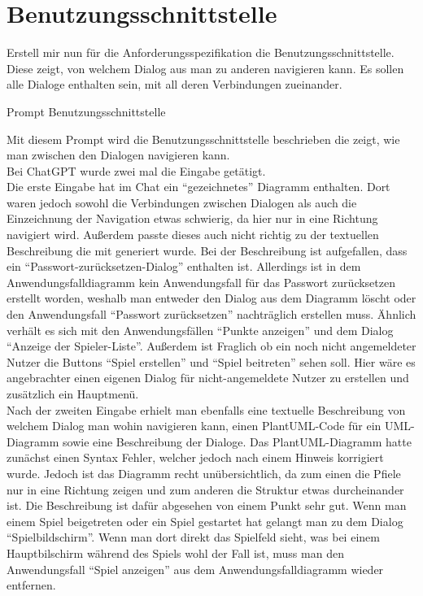 \section*{Benutzungsschnittstelle}

\begin{prompt}[H]
    \begin{tcolorbox}[colback=gray!20, colframe=gray!20, boxrule=0pt, sharp corners] 
        Erstell mir nun für die Anforderungsspezifikation die Benutzungsschnittstelle. Diese zeigt, von welchem Dialog aus man zu anderen 
        navigieren kann. Es sollen alle Dialoge enthalten sein, mit all deren Verbindungen zueinander.
        \vfill
    \end{tcolorbox}
    \caption{Prompt Benutzungsschnittstelle}
    \label{Prompt Benutzungsschnittstelle}
\end{prompt}

Mit diesem Prompt wird die Benutzungsschnittstelle beschrieben die zeigt, wie man zwischen den Dialogen navigieren kann.\\

Bei ChatGPT wurde zwei mal die Eingabe getätigt.\\
Die erste Eingabe hat im Chat ein ``gezeichnetes'' Diagramm enthalten. Dort waren jedoch sowohl die Verbindungen zwischen Dialogen als auch 
die Einzeichnung der Navigation etwas schwierig, da hier nur in eine Richtung navigiert wird. Außerdem passte dieses auch nicht richtig zu 
der textuellen Beschreibung die mit generiert wurde. Bei der Beschreibung ist aufgefallen, dass ein ``Passwort-zurücksetzen-Dialog'' enthalten 
ist. Allerdings ist in dem Anwendungsfalldiagramm kein Anwendungsfall für das Passwort zurücksetzen erstellt worden, weshalb man entweder 
den Dialog aus dem Diagramm löscht oder den Anwendungsfall ``Passwort zurücksetzen'' nachträglich erstellen muss. Ähnlich verhält es sich mit 
den Anwendungsfällen ``Punkte anzeigen'' und dem Dialog ``Anzeige der Spieler-Liste''. Außerdem ist Fraglich 
ob ein noch nicht angemeldeter Nutzer die Buttons ``Spiel erstellen'' und ``Spiel beitreten'' sehen soll. Hier wäre es angebrachter einen 
eigenen Dialog für nicht-angemeldete Nutzer zu erstellen und zusätzlich ein Hauptmenü.\\
Nach der zweiten Eingabe erhielt man ebenfalls eine textuelle Beschreibung von welchem Dialog man wohin navigieren kann, einen PlantUML-Code
für ein UML-Diagramm sowie eine Beschreibung der Dialoge. Das PlantUML-Diagramm hatte zunächst einen Syntax Fehler, welcher jedoch nach einem 
Hinweis korrigiert wurde. Jedoch ist das Diagramm recht unübersichtlich, da zum einen die Pfiele nur in eine Richtung zeigen und zum anderen
die Struktur etwas durcheinander ist. Die Beschreibung ist dafür abgesehen von einem Punkt sehr gut. Wenn man einem Spiel beigetreten oder 
ein Spiel gestartet hat gelangt man zu dem Dialog ``Spielbildschirm''. Wenn man dort direkt das Spielfeld sieht, was bei einem Hauptbilschirm
während des Spiels wohl der Fall ist, muss man den Anwendungsfall ``Spiel anzeigen'' aus dem Anwendungsfalldiagramm wieder entfernen.\\

